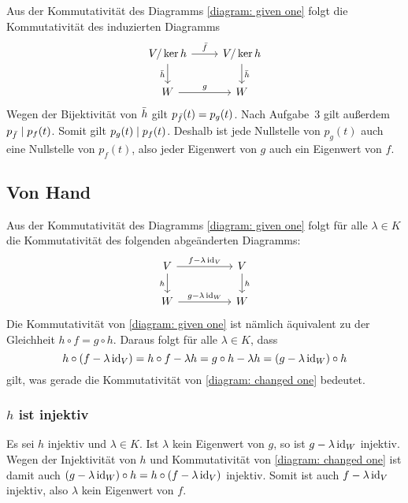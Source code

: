 Aus der Kommutativität des Diagramms \eqref{diagram: given one} folgt die Kommutativität des induzierten Diagramms
\[
  \begin{tikzcd}
      V/\ker h
      \arrow{r}{\induced{f}}
      \arrow[swap]{d}{\induced{h}}
    & V/\ker h
      \arrow{d}{\induced{h}}
    \\
      W
      \arrow{r}{g}
    & W
  \end{tikzcd}
\]
Wegen der Bijektivität von $\bar{h}$ gilt $p_{\bar{f}}(t) = p_g(t)$.
Nach Aufgabe~3 gilt außerdem $p_{\bar{f}} \mathrel{|} p_f(t)$.
Somit gilt $p_g(t) \mathrel{|} p_f(t)$.
Deshalb ist jede Nullstelle von $p_g(t)$ auch eine Nullstelle von $p_f(t)$, also jeder Eigenwert von $g$ auch ein Eigenwert von $f$.












\subsection*{Von Hand}

Aus der Kommutativität des Diagramms \eqref{diagram: given one} folgt für alle $\lambda \in K$ die Kommutativität des folgenden abgeänderten Diagramms:
\begin{equation}
  \label{diagram: changed one}
  \begin{tikzcd}[column sep = huge]
      V
      \arrow{r}{f - \lambda \id_V}
      \arrow[swap]{d}{h}
    & V
      \arrow{d}{h}
    \\
      W
      \arrow{r}{g - \lambda \id_W}
    & W
  \end{tikzcd}
\end{equation}
Die Kommutativität von \eqref{diagram: given one} ist nämlich äquivalent zu der Gleichheit $h \circ f = g \circ h$.
Daraus folgt für alle $\lambda \in K$, dass
\[
    h \circ (f - \lambda \operatorname{id}_V)
  = h \circ f - \lambda h
  = g \circ h - \lambda h
  = (g - \lambda \operatorname{id}_W) \circ h
\]
gilt, was gerade die Kommutativität von \eqref{diagram: changed one} bedeutet.



\subsubsection{\texorpdfstring{$h$}{h} ist injektiv}

Es sei $h$ injektiv und $\lambda \in K$.
Ist $\lambda$ kein Eigenwert von $g$, so ist $g - \lambda \operatorname{id}_W$ injektiv.
Wegen der Injektivität von $h$ und Kommutativität von \eqref{diagram: changed one} ist damit auch $(g - \lambda \operatorname{id}_W) \circ h = h \circ (f - \lambda \operatorname{id}_V)$ injektiv.
Somit ist auch $f - \lambda \operatorname{id}_V$ injektiv, also $\lambda$ kein Eigenwert von $f$.



